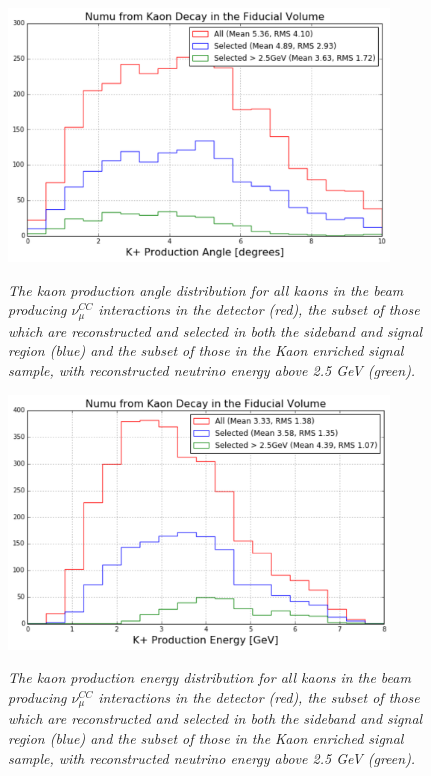 \begin{figure}[ht!]
\centering
	\includegraphics[width=0.9\textwidth]{Figures/kaon_angle_selection.png} \\
\caption{\textit{The kaon production angle distribution for all kaons in the beam producing $\nu_\mu^{CC}$ interactions in the detector (red), the subset of those which are reconstructed and selected in both the sideband and signal region (blue) and the subset of those in the Kaon enriched signal sample, with reconstructed neutrino energy above 2.5 GeV (green).}}\label{kaon_angle_selection}
\end{figure}


\begin{figure}[ht!]
\centering
	\includegraphics[width=0.9\textwidth]{Figures/kaon_energy_selection.png} \\
\caption{\textit{The kaon production energy distribution for all kaons in the beam producing $\nu_\mu^{CC}$ interactions in the detector (red), the subset of those which are reconstructed and selected in both the sideband and signal region (blue) and the subset of those in the Kaon enriched signal sample, with reconstructed neutrino energy above 2.5 GeV (green).}}\label{kaon_energy_selection}
\end{figure}



